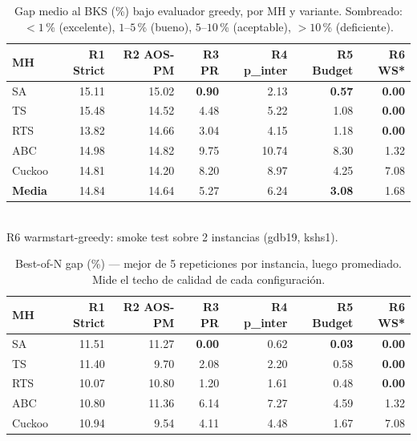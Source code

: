 \documentclass[11pt,a4paper]{article}
\theoremstyle{definition}
\theoremstyle{remark}
\begin{document}
\begin{table}[h]
\centering
\caption{Gap medio al BKS (\%) bajo evaluador greedy, por MH y variante.
         Sombreado: $< 1$\,\% (excelente), $1$--$5$\,\% (bueno),
         $5$--$10$\,\% (aceptable), $> 10$\,\% (deficiente).}
\label{tab:re-greedy-gap}
\small
\begin{tabular}{lrrrrrr}
\toprule
MH & R1 Strict & R2 AOS-PM & R3 PR & R4 p\_inter & R5 Budget & R6 WS* \\
\midrule
SA      & 15.11 & 15.02 & \textbf{0.90} & 2.13 & \textbf{0.57} & \textbf{0.00} \\
TS      & 15.48 & 14.52 & 4.48          & 5.22 & 1.08          & \textbf{0.00} \\
RTS     & 13.82 & 14.66 & 3.04          & 4.15 & 1.18          & \textbf{0.00} \\
ABC     & 14.98 & 14.82 & 9.75          & 10.74 & 8.30         & 1.32 \\
Cuckoo  & 14.81 & 14.20 & 8.20          & 8.97  & 4.25         & 7.08 \\
\midrule
\textbf{Media} & 14.84 & 14.64 & 5.27 & 6.24 & \textbf{3.08} & 1.68 \\
\bottomrule
\end{tabular}
\\[4pt]
\footnotesize *R6 warmstart-greedy: smoke test sobre 2 instancias (gdb19, kshs1).
\end{table}

\begin{table}[h]
\centering
\caption{Best-of-N gap (\%) — mejor de 5 repeticiones por instancia,
         luego promediado. Mide el techo de calidad de cada configuración.}
\label{tab:re-greedy-bon}
\small
\begin{tabular}{lrrrrrr}
\toprule
MH & R1 Strict & R2 AOS-PM & R3 PR & R4 p\_inter & R5 Budget & R6 WS* \\
\midrule
SA      & 11.51 & 11.27 & \textbf{0.00} & 0.62 & \textbf{0.03} & \textbf{0.00} \\
TS      & 11.40 &  9.70 & 2.08          & 2.20 & 0.58          & \textbf{0.00} \\
RTS     & 10.07 & 10.80 & 1.20          & 1.61 & 0.48          & \textbf{0.00} \\
ABC     & 10.80 & 11.36 & 6.14          & 7.27 & 4.59          & 1.32 \\
Cuckoo  & 10.94 &  9.54 & 4.11          & 4.48 & 1.67          & 7.08 \\
\bottomrule
\end{tabular}
\end{table}
\end{document}
